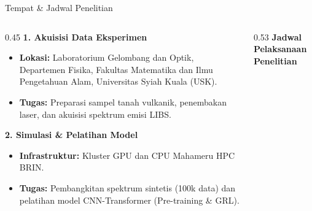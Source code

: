 \documentclass{beamer}
\begin{document}
\begin{frame}{Tempat \& Jadwal Penelitian}
  \begin{columns}[t]
    \begin{column}{0.45\textwidth}
      \small
      \textbf{1. Akuisisi Data Eksperimen}
      \fontsize{7.5pt}{9pt}\selectfont
      \begin{itemize}
        \item \textbf{Lokasi:} Laboratorium Gelombang dan Optik, Departemen Fisika, Fakultas Matematika dan Ilmu Pengetahuan Alam, Universitas Syiah Kuala (USK).
        \item \textbf{Tugas:} Preparasi sampel tanah vulkanik, penembakan laser, dan akuisisi spektrum emisi LIBS.
      \end{itemize}

      \vspace{0.4em}
      \small
      \textbf{2. Simulasi \& Pelatihan Model}
      \fontsize{7.5pt}{9pt}\selectfont
      \begin{itemize}
        \item \textbf{Infrastruktur:} Kluster GPU dan CPU Mahameru HPC BRIN.
        \item \textbf{Tugas:} Pembangkitan spektrum sintetis (100k data) dan pelatihan model CNN-Transformer (Pre-training \& GRL).
      \end{itemize}
    \end{column}

    \begin{column}{0.53\textwidth}
      \centering
      \small\textbf{Jadwal Pelaksanaan Penelitian}
      \vspace{0.3em}
      

\end{column}
\end{columns}
\end{frame}
\end{document}
